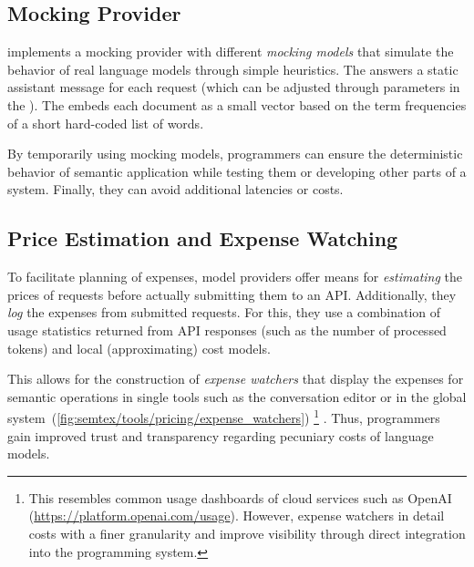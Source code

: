 \subsection{Mocking Provider}
\label{sec:semtex/tools/mocking}

\semtex implements a mocking provider with different \emph{mocking models} that simulate the behavior of real language models through simple heuristics.
The  answers a static assistant message for each request (which can be adjusted through parameters in the ).
The  embeds each document as a small vector based on the term frequencies of a short hard-coded list of words.

By temporarily using mocking models, programmers can ensure the deterministic behavior of semantic application while testing them or developing other parts of a system.
Finally, they can avoid additional latencies or costs.

\subsection{Price Estimation and Expense Watching}
\label{sec:semtex/tools/pricing}

To facilitate planning of expenses, model providers offer means for \emph{estimating} the prices of requests before actually submitting them to an API.
Additionally, they \emph{log} the expenses from submitted requests.
For this, they use a combination of usage statistics returned from API responses (such as the number of processed tokens) and local (approximating) cost models.

This allows for the construction of \emph{expense watchers} that display the expenses for semantic operations in single tools such as the conversation editor or in the global system~(\cref{fig:semtex/tools/pricing/expense_watchers})%
\footnote{%
	This resembles common usage dashboards of cloud services such as OpenAI (\url{https://platform.openai.com/usage}).
	However, expense watchers in \semtex detail costs with a finer granularity and improve visibility through direct integration into the programming system.
}%
.
Thus, programmers gain improved trust and transparency regarding pecuniary costs of language models.

